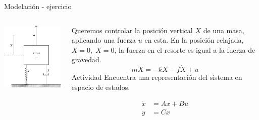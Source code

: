 \documentclass[presentation,aspectratio=1610]{beamer}
\begin{document}
\begin{frame}[label={sec:orge11cccf}]{Modelación - ejercicio}
\begin{columns}
\begin{column}{0.5\columnwidth}
\includegraphics[height=0.5\textheight]{../../figures/mass-spring-damper}
\end{column}

\begin{column}{0.5\columnwidth}
 Queremos controlar la posición vertical \(X\) de una masa, aplicando una fuerza \(u\) en esta. En la posición relajada, \(X=0, \; \dot{X} =0\), la fuerza en el resorte es igual a la fuerza de gravedad.  
\[ m\ddot{X} = -kX - f\dot{X} + u\]
\alert{Actividad} Encuentra una representación del sistema en espacio de estados. 

\begin{align*}
\dot{x} &= A x + Bu\\ y &= Cx 
\end{align*}
\end{column}
\end{columns}
\end{frame}
\end{document}
